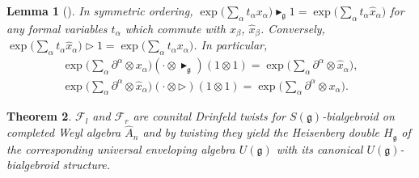 \documentclass[10pt,a4paper]{amsart}
\def\gg{\mathfrak{g}}
\def\hx{\hat{x}}
\newtheorem{Theorem}{Theorem}[section]
\newtheorem{Lemma}[Theorem]{Lemma}
\numberwithin{equation}{section}
\begin{document}
\begin{Lemma}[\cite{scopr}]\label{lem:exp}
In symmetric ordering, $\exp\big(\sum_\alpha t_\alpha x_\alpha\big)\blacktriangleright_\gg 1 = \exp\big(\sum_\alpha t_\alpha\hx_\alpha\big)$ for any formal variables $t_\alpha$ which commute with $x_\beta$, $\hx_\beta$. Conversely, $\exp\big(\sum_\alpha t_\alpha\hx_\alpha\big)\triangleright 1 = \exp\big(\sum_\alpha t_\alpha x_\alpha\big)$. In particular,
\begin{gather}%
\exp\bigg(\sum_\alpha \partial^\alpha\otimes x_\alpha\bigg)(\cdot \otimes\blacktriangleright_\gg) (1\otimes 1) =
\exp\bigg(\sum_\alpha \partial^\alpha\otimes \hat{x}_\alpha\bigg),\nonumber\\
\label{eq:exp2exp}
\exp\bigg(\sum_\alpha \partial^\alpha\otimes \hat{x}_\alpha\bigg)
(\cdot \otimes\triangleright) (1\otimes 1) =\exp\bigg(\sum_\alpha \partial^\alpha\otimes x_\alpha\bigg).
\end{gather}
\end{Lemma}


\begin{Theorem} \label{th:main}
$\mathcal{F}_l$ and $\mathcal{F}_r$ are
counital Drinfeld twists for $S(\gg)$-bialgebroid
on completed Weyl algebra $\hat{A}_n$ and by twisting
they yield the Heisenberg double $H_\gg$
of the corresponding universal enveloping algebra $U(\gg)$
with its canonical $U(\gg)$-bialgebroid structure.
\end{Theorem}
\end{document}
